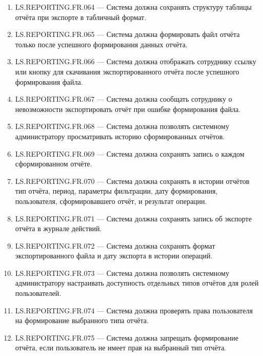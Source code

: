 \documentclass[12pt,a4paper]{article}
\begin{document}
\begin{enumerate}
		\item LS.REPORTING.FR.064 --- Система должна сохранять структуру таблицы отчёта
		при экспорте в табличный формат.
		
		\item LS.REPORTING.FR.065 --- Система должна формировать файл отчёта только после
		успешного формирования данных отчёта.
		
		\item LS.REPORTING.FR.066 --- Система должна отображать сотруднику ссылку или
		кнопку для скачивания экспортированного отчёта после успешного формирования
		файла.
		
		\item LS.REPORTING.FR.067 --- Система должна сообщать сотруднику о невозможности
		экспортировать отчёт при ошибке формирования файла.
		
		\item LS.REPORTING.FR.068 --- Система должна позволять системному администратору
		просматривать историю сформированных отчётов.
		
		\item LS.REPORTING.FR.069 --- Система должна сохранять запись о каждом сформированном
		отчёте.
		
		\item LS.REPORTING.FR.070 --- Система должна сохранять в истории отчётов тип отчёта,
		период, параметры фильтрации, дату формирования, пользователя, сформировавшего
		отчёт, и результат операции.
		
		\item LS.REPORTING.FR.071 --- Система должна сохранять запись об экспорте отчёта
		в журнале действий.
		
		\item LS.REPORTING.FR.072 --- Система должна сохранять формат экспортированного
		файла и дату экспорта в истории операций.
		
		\item LS.REPORTING.FR.073 --- Система должна позволять системному администратору
		настраивать доступность отдельных типов отчётов для ролей пользователей.
		
		\item LS.REPORTING.FR.074 --- Система должна проверять права пользователя на
		формирование выбранного типа отчёта.
		
		\item LS.REPORTING.FR.075 --- Система должна запрещать формирование отчёта, если
		пользователь не имеет прав на выбранный тип отчёта.
		

\end{enumerate}
\end{document}
